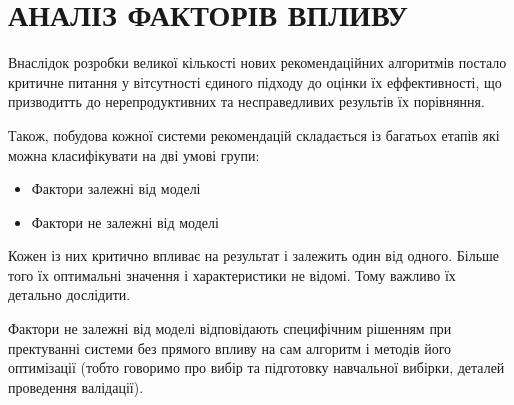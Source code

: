 \section{АНАЛІЗ ФАКТОРІВ ВПЛИВУ}
Внаслідок розробки великої кількості нових рекомендаційних алгоритмів постало критичне питання у вітсутності єдиного підходу до оцінки їх еффективності, що призводитть до нерепродуктивних та несправедливих результів їх порівняння.

Також, побудова кожної системи рекомендацій складається із багатьох етапів які можна класифікувати на дві умові групи:
\begin{itemize}
    \item Фактори залежні від моделі
    \item Фактори не залежні від моделі
\end{itemize}
Кожен із них критично впливає на результат і залежить один від одного. Більше того їх оптимальні значення і характеристики не відомі. Тому важливо їх детально дослідити.

Фактори не залежні від моделі відповідають специфічним рішенням при пректуванні системи без прямого впливу на сам алгоритм і методів його оптимізації (тобто говоримо про вибір та підготовку навчальної вибірки, деталей проведення валідації).

